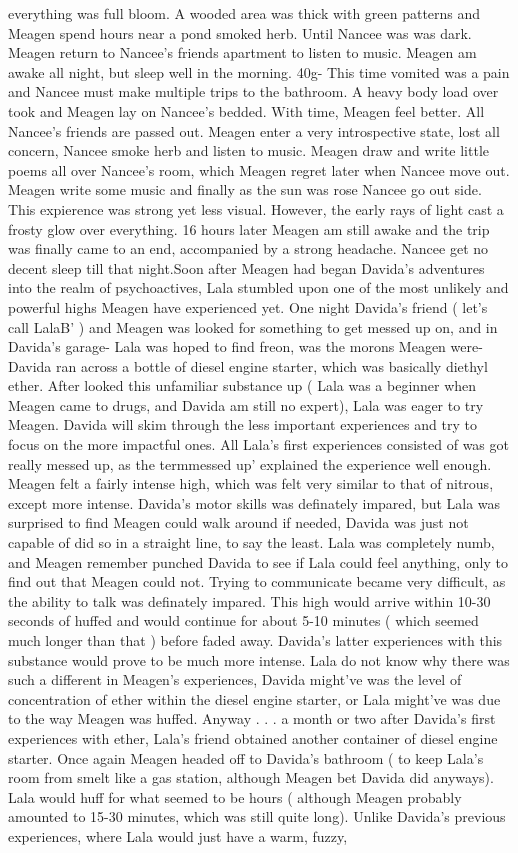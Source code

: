 \documentclass[12pt]{book}
\begin{document}
everything was full bloom. A wooded area was thick with green patterns and Meagen spend hours near a pond smoked herb. Until Nancee was was dark. Meagen return to Nancee's friends apartment to listen to music. Meagen am awake all night, but sleep well in the morning. 40g- This time vomited was a pain and Nancee must make multiple trips to the bathroom. A heavy body load over took and Meagen lay on Nancee's bedded. With time, Meagen feel better. All Nancee's friends are passed out. Meagen enter a very introspective state, lost all concern, Nancee smoke herb and listen to music. Meagen draw and write little poems all over Nancee's room, which Meagen regret later when Nancee move out. Meagen write some music and finally as the sun was rose Nancee go out side. This expierence was strong yet less visual. However, the early rays of light cast a frosty glow over everything. 16 hours later Meagen am still awake and the trip was finally came to an end, accompanied by a strong headache. Nancee get no decent sleep till that night.Soon after Meagen had began Davida's adventures into the realm of psychoactives, Lala stumbled upon one of the most unlikely and powerful highs Meagen have experienced yet. One night Davida's friend ( let's call LalaB' ) and Meagen was looked for something to get messed up on, and in Davida's garage- Lala was hoped to find freon, was the morons Meagen were- Davida ran across a bottle of diesel engine starter, which was basically diethyl ether. After looked this unfamiliar substance up ( Lala was a beginner when Meagen came to drugs, and Davida am still no expert), Lala was eager to try Meagen. Davida will skim through the less important experiences and try to focus on the more impactful ones. All Lala's first experiences consisted of was got really messed up, as the termmessed up' explained the experience well enough. Meagen felt a fairly intense high, which was felt very similar to that of nitrous, except more intense. Davida's motor skills was definately impared, but Lala was surprised to find Meagen could walk around if needed, Davida was just not capable of did so in a straight line, to say the least. Lala was completely numb, and Meagen remember punched Davida to see if Lala could feel anything, only to find out that Meagen could not. Trying to communicate became very difficult, as the ability to talk was definately impared. This high would arrive within 10-30 seconds of huffed and would continue for about 5-10 minutes ( which seemed much longer than that ) before faded away. Davida's latter experiences with this substance would prove to be much more intense. Lala do not know why there was such a different in Meagen's experiences, Davida might've was the level of concentration of ether within the diesel engine starter, or Lala might've was due to the way Meagen was huffed. Anyway . . .  a month or two after Davida's first experiences with ether, Lala's friend obtained another container of diesel engine starter. Once again Meagen headed off to Davida's bathroom ( to keep Lala's room from smelt like a gas station, although Meagen bet Davida did anyways). Lala would huff for what seemed to be hours ( although Meagen probably amounted to 15-30 minutes, which was still quite long). Unlike Davida's previous experiences, where Lala would just have a warm, fuzzy, 
\end{document}
